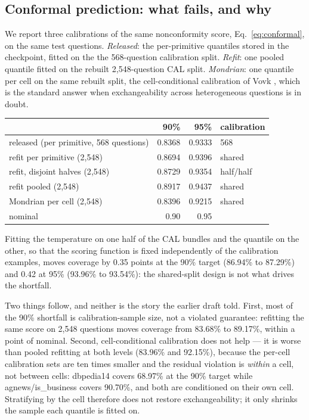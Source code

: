 \subsection{Conformal prediction: what fails, and why}
\label{sec:conformal}

We report three calibrations of the same nonconformity score, Eq.~\eqref{eq:conformal}, on the same
test questions. \emph{Released}: the per-primitive quantiles stored in the checkpoint, fitted on the
the 568-question calibration split. \emph{Refit}: one pooled quantile fitted on the rebuilt
2{,}548-question CAL split. \emph{Mondrian}: one quantile per
cell on the same rebuilt split, the cell-conditional calibration of Vovk \cite{vovk2012conditional}, which is the standard answer when
exchangeability across heterogeneous questions is in doubt.

\begin{center}
\footnotesize
\begin{tabular}{lrrl}
\toprule
 & 90\% & 95\% & calibration \\
\midrule
released (per primitive, 568 questions) & 0.8368 & 0.9333 & 568 \\
refit per primitive (2{,}548) & 0.8694 & 0.9396 & shared \\
refit, disjoint halves (2{,}548) & 0.8729 & 0.9354 & half/half \\
refit pooled (2{,}548) & 0.8917 & 0.9437 & shared \\
Mondrian per cell (2{,}548) & 0.8396 & 0.9215 & shared \\
\midrule
nominal & 0.90 & 0.95 & \\
\bottomrule
\end{tabular}
\end{center}

Fitting the temperature on one half of the CAL bundles and the quantile on the other, so that the
scoring function is fixed independently of the calibration examples, moves coverage by 0.35 points
at the 90\% target (86.94\% to 87.29\%) and 0.42 at 95\% (93.96\% to 93.54\%): the shared-split
design is not what drives the shortfall.

Two things follow, and neither is the story the earlier draft told. First, most of the 90\% shortfall
is calibration-sample size, not a violated guarantee: refitting the same score on 2{,}548 questions
moves coverage from 83.68\% to 89.17\%, within a point of nominal. Second, cell-conditional
calibration does not help — it is worse than pooled refitting at both levels (83.96\% and 92.15\%),
because the per-cell calibration sets are ten times smaller and the residual violation is
\emph{within} a cell, not between cells: dbpedia14 covers 68.97\% at the 90\% target while
agnews/is\_business covers 90.70\%, and both are conditioned on their own cell. Stratifying by the
cell therefore does not restore exchangeability; it only shrinks the sample each quantile is fitted
on.

